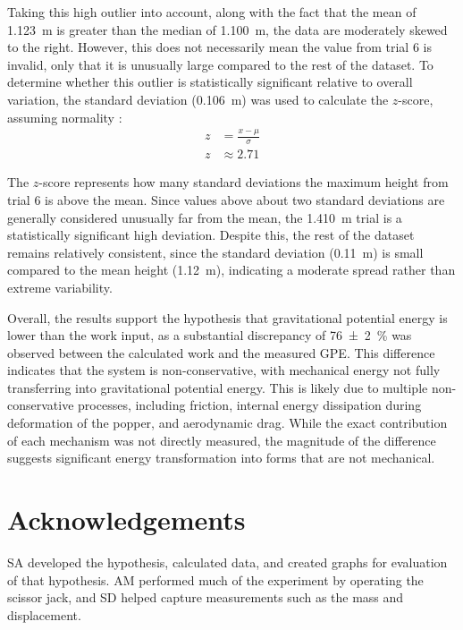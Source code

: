 \documentclass[reprint,amsmath,amssymb,aps,twoside]{revtex4-2} %
\begin{document}
Taking this high outlier into account, along with the fact that the mean of \qty{1.123}{\meter} is greater than the median of \qty{1.100}{\meter}, the data are moderately skewed to the right. However, this does not necessarily mean the value from trial 6 is invalid, only that it is unusually large compared to the rest of the dataset. To determine whether this outlier is statistically significant relative to overall variation, the standard deviation (\qty{0.106}{\meter}) was used to calculate the $z$-score, assuming normality \cite{starnes:2015:practice}:
\begin{align}
z &= \frac{x-\mu}{\sigma} \\
z &\approx 2.71
\end{align}

The $z$-score represents how many standard deviations the maximum height from trial 6 is above the mean. Since values above about two standard deviations are generally considered unusually far from the mean, the \qty{1.410}{\meter} trial is a statistically significant high deviation. Despite this, the rest of the dataset remains relatively consistent, since the standard deviation (\qty{0.11}{\meter}) is small compared to the mean height (\qty{1.12}{\meter}), indicating a moderate spread rather than extreme variability.

Overall, the results support the hypothesis that gravitational potential energy is lower than the work input, as a substantial discrepancy of \qty{76\pm2}{\percent} was observed between the calculated work and the measured GPE. This difference indicates that the system is non-conservative, with mechanical energy not fully transferring into gravitational potential energy. This is likely due to multiple non-conservative processes, including friction, internal energy dissipation during deformation of the popper, and aerodynamic drag. While the exact contribution of each mechanism was not directly measured, the magnitude of the difference suggests significant energy transformation into forms that are not mechanical.
\vspace{3em}




\section{Acknowledgements}
SA developed the hypothesis, calculated data, and created graphs for evaluation of that hypothesis. AM performed much of the experiment by operating the scissor jack, and SD helped capture measurements such as the mass and displacement.


\end{document}
